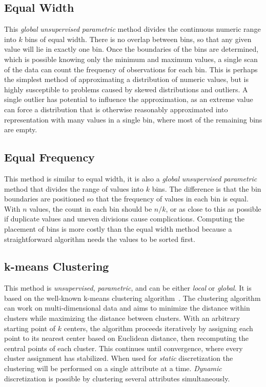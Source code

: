 \subsection{Equal Width}

This {\em global} {\em unsupervised} {\em parametric} method divides the continuous numeric range into $k$ bins of equal width. There is no overlap between bins, so that any given value will lie in exactly one bin. Once the boundaries of the bins are determined, which is possible knowing only the minimum and maximum values, a single scan of the data can count the frequency of observations for each bin. This is perhaps the simplest method of approximating a distribution of numeric values, but is highly susceptible to problems caused by skewed distributions and outliers. A single outlier has potential to influence the approximation, as an extreme value can force a distribution that is otherwise reasonably approximated into representation with many values in a single bin, where most of the remaining bins are empty.

\subsection{Equal Frequency}

This method is similar to equal width, it is also a {\em global} {\em unsupervised} {\em parametric} method that divides the range of values into $k$ bins. The difference is that the bin boundaries are positioned so that the frequency of values in each bin is equal. With $n$ values, the count in each bin should be $n/k$, or as close to this as possible if duplicate values and uneven divisions cause complications. Computing the placement of bins is more costly than the equal width method because a straightforward algorithm needs the values to be sorted first.

\subsection{k-means Clustering}

This method is {\em unsupervised}, {\em parametric}, and can be either {\em local} or {\em global}. It is based on the well-known k-means clustering algorithm~\cite{kmeans}. The clustering algorithm can work on multi-dimensional data and aims to minimize the distance within clusters while maximizing the distance between clusters. With an arbitrary starting point of $k$ centers, the algorithm proceeds iteratively by assigning each point to its nearest center based on Euclidean distance, then recomputing the central points of each cluster. This continues until convergence, where every cluster assignment has stabilized. When used for {\em static} discretization the clustering will be performed on a single attribute at a time. {\em Dynamic} discretization is possible by clustering several attributes simultaneously. 

